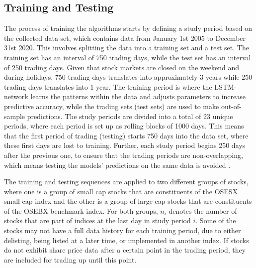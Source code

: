 \subsection{Training and Testing}
The process of training the algorithms starts by defining a study period based on the collected data set, which contains data from January 1st 2005 to December 31st 2020. This involves splitting the data into a training set and a test set. The training set has an interval of 750 trading days, while the test set has an interval of 250 trading days. Given that stock markets are closed on the weekend and during holidays, 750 trading days translates into approximately 3 years while 250 trading days translates into 1 year. The training period is where the LSTM-network learns the patterns within the data and adjusts parameters to increase predictive accuracy, while the trading sets (test sets) are used to make out-of-sample predictions. The study periods are divided into a total of 23 unique periods, where each period is set up as rolling blocks of 1000 days. This means that the first period of trading (testing) starts 750 days into the data set, where these first days are lost to training. Further, each study period begins 250 days after the previous one, to ensure that the trading periods are non-overlapping, which means testing the models' predictions on the same data is avoided \cite{krauss}.

\indent\newline
The training and testing sequences are applied to two different groups of stocks, where one is a group of small cap stocks that are constituents of the OSESX small cap index and the other is a group of large cap stocks that are constituents of the OSEBX benchmark index.  For both groups, $n_{i}$ denotes the number of stocks that are part of indices at the last day in study period $\textit{i}$. Some of the stocks may not have a full data history for each training period, due to either delisting, being listed at a later time, or implemented in another index. If stocks do not exhibit share price data after a certain point in the trading period, they are included for trading up until this point.     

